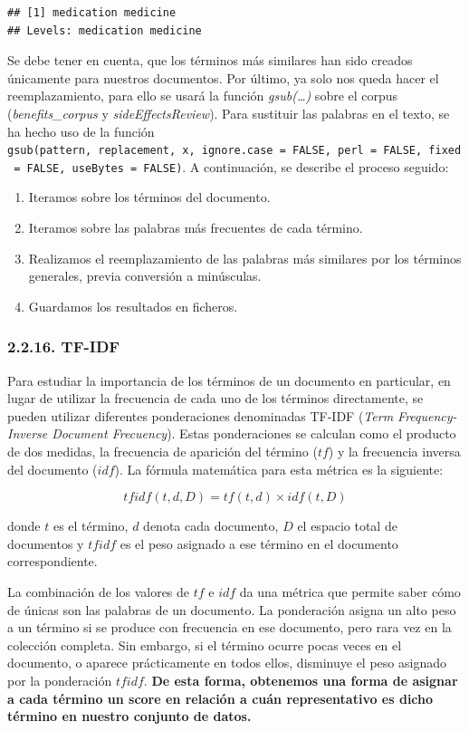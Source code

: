 \documentclass[spanish,]{article}
\providecommand{\tightlist}{%
  \setlength{\itemsep}{0pt}\setlength{\parskip}{0pt}}
\begin{document}
\begin{verbatim}
## [1] medication medicine  
## Levels: medication medicine
\end{verbatim}

Se debe tener en cuenta, que los términos más similares han sido creados
únicamente para nuestros documentos. Por último, ya solo nos queda hacer
el reemplazamiento, para ello se usará la función \emph{gsub(\ldots{})}
sobre el corpus (\emph{benefits\_corpus} y \emph{sideEffectsReview}).
Para sustituir las palabras en el texto, se ha hecho uso de la función
\texttt{gsub(pattern,\ replacement,\ x,\ ignore.case\ =\ FALSE,\ perl\ =\ FALSE,\ fixed\ =\ FALSE,\ useBytes\ =\ FALSE)}.
A continuación, se describe el proceso seguido:

\begin{enumerate}
\def\labelenumi{\arabic{enumi}.}
\tightlist
\item
  Iteramos sobre los términos del documento.
\item
  Iteramos sobre las palabras más frecuentes de cada término.
\item
  Realizamos el reemplazamiento de las palabras más similares por los
  términos generales, previa conversión a minúsculas.
\item
  Guardamos los resultados en ficheros.
\end{enumerate}

\subsubsection{2.2.16. TF-IDF}\label{tf-idf}

Para estudiar la importancia de los términos de un documento en
particular, en lugar de utilizar la frecuencia de cada uno de los
términos directamente, se pueden utilizar diferentes ponderaciones
denominadas TF-IDF (\emph{Term Frequency-Inverse Document Frecuency}).
Estas ponderaciones se calculan como el producto de dos medidas, la
frecuencia de aparición del término (\(tf\)) y la frecuencia inversa del
documento (\(idf\)). La fórmula matemática para esta métrica es la
siguiente:

\[ tfidf(t, d, D) = tf(t, d) × idf(t, D)\]

donde \(t\) es el término, \(d\) denota cada documento, \(D\) el espacio
total de documentos y \(tfidf\) es el peso asignado a ese término en el
documento correspondiente.

La combinación de los valores de \(tf\) e \(idf\) da una métrica que
permite saber cómo de únicas son las palabras de un documento. La
ponderación asigna un alto peso a un término si se produce con
frecuencia en ese documento, pero rara vez en la colección completa. Sin
embargo, si el término ocurre pocas veces en el documento, o aparece
prácticamente en todos ellos, disminuye el peso asignado por la
ponderación \(tfidf\). \textbf{De esta forma, obtenemos una forma de
asignar a cada término un score en relación a cuán representativo es
dicho término en nuestro conjunto de datos.}
\end{document}
